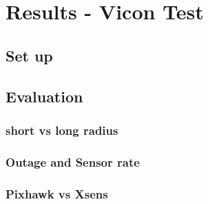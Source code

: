 \chapter{Results - Vicon Test}\label{cha4}
\section{Set up}
\section{Evaluation}
\subsection{short vs long radius}
\subsection{Outage and Sensor rate}
\subsection{Pixhawk vs Xsens}


